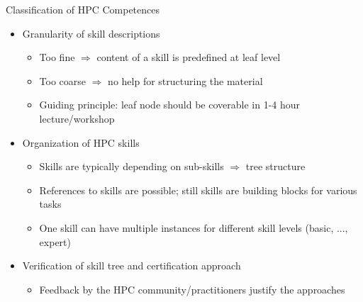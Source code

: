 \documentclass[compress,aspectratio=169]{beamer}
\begin{document}
\begin{frame}{Classification of HPC Competences}
	\begin{itemize}
		\item Granularity of skill descriptions
		\begin{itemize}
			\item Too fine $\Rightarrow$ content of a skill is predefined at leaf level
			\item Too coarse $\Rightarrow$ no help for structuring the material
			\item Guiding principle: leaf node should be coverable in 1-4 hour lecture/workshop
		\end{itemize}


    \item Organization of HPC skills
    \begin{itemize}
      \item Skills are typically depending on sub-skills $\Rightarrow$ tree structure
      \item References to skills are possible; still skills are building blocks for various tasks
      \item One skill can have multiple instances for different skill levels (basic, ..., expert)
    \end{itemize}


    \item Verification of skill tree and certification approach
      \begin{itemize}
        \item Feedback by the HPC community/practitioners justify the approaches
      \end{itemize}
	\end{itemize}
\end{frame}
\end{document}
